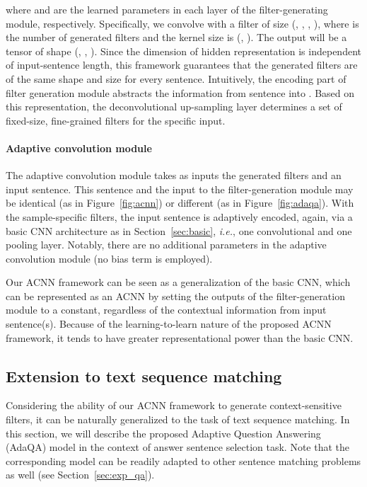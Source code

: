 \documentclass[11pt,a4paper]{article}
\begin{document}
where  and  are the learned parameters in each layer of the filter-generating module, respectively. Specifically, we convolve  with a filter of size (, , , ), where  is the number of generated filters and the kernel size is (, ). The output will be a tensor of shape (, , ). Since the dimension of hidden representation  is independent of input-sentence length, this framework guarantees that the generated filters are of the same shape and size for every sentence.
Intuitively, the encoding part of filter generation module abstracts the information from sentence  into . Based on this representation, the deconvolutional up-sampling layer determines a set of fixed-size, fine-grained filters  for the specific input.

\paragraph{Adaptive convolution module}
The adaptive convolution module takes as inputs the generated filters  and an input sentence. This sentence and the input to the filter-generation module may be identical (as in Figure~\ref{fig:acnn}) or different (as in Figure~\ref{fig:adaqa}). With the sample-specific filters, the input sentence is adaptively encoded, again, via a basic CNN architecture as in Section~\ref{sec:basic}, \emph{i.e.}, one convolutional and one pooling layer. Notably, there are no additional parameters in the adaptive convolution module (no bias term is employed).

Our ACNN framework can be seen as a generalization of the basic CNN, which can be represented as an ACNN by setting the outputs of the filter-generation module to a constant, regardless of the contextual information from input sentence(s). Because of the learning-to-learn \citep{thrun2012learning}
nature of the proposed ACNN framework, it tends to have greater representational power than the basic CNN.

\subsection{Extension to text sequence matching} \label{sec:adaqa} Considering the ability of our ACNN framework to generate context-sensitive filters, it can be naturally generalized to the task of text sequence matching. In this section, we will describe the proposed Adaptive Question Answering (AdaQA) model in the context of answer sentence selection task. Note that the corresponding model can be readily adapted to other sentence matching problems  as well (see Section~\ref{sec:exp_qa}). 
\end{document}
